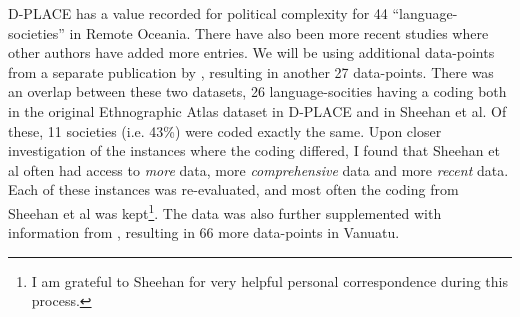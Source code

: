 \documentclass[unnumsec,webpdf,modern,medium]{oup-authoring-template}
\begin{document}
\begin{appendices}
D-PLACE has a value recorded for political complexity for 44 ``language-societies'' in Remote Oceania. There have also been more recent studies where other authors have added more entries. We will be using additional data-points from a separate publication by \citet{sheehan2018coevolution}, resulting in another 27 data-points. There was an overlap between these two datasets, 26 language-socities having a coding both in the original Ethnographic Atlas dataset in D-PLACE and in Sheehan et al. Of these, 11 societies (i.e. 43\%) were coded exactly the same. Upon closer investigation of the instances where the coding differed, I found that Sheehan et al often had access to \textit{more} data, more \textit{comprehensive} data and more \textit{recent} data. Each of these instances was re-evaluated, and most often the coding from Sheehan et al was kept\footnote{I am grateful to Sheehan for very helpful personal correspondence during this process.}. The data was also further supplemented with information from \citet[201]{bonnemaison1996graded}, resulting in 66 more data-points in Vanuatu. 




\end{appendices}
\end{document}
